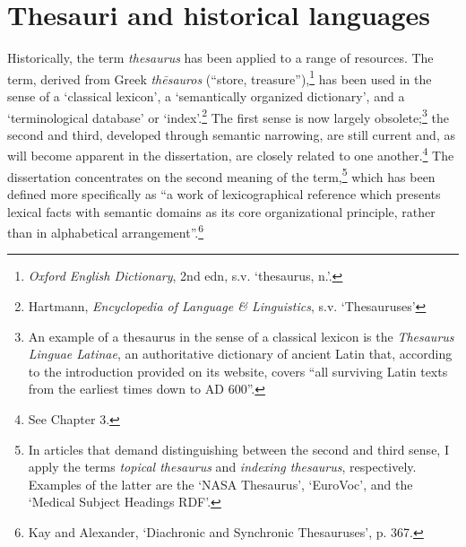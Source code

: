 \section{Thesauri and historical languages}
\label{sect:Introduction:Thesaurus}

Historically, the term \textit{thesaurus} has been applied to a range of resources. The term, derived from Greek \textit{thēsauros} (``store, treasure''),\footnote{\textit{Oxford English Dictionary}, 2nd edn, s.v. `thesaurus, n.'.} has been used in the sense of a `classical lexicon', a `semantically organized dictionary', and a `terminological database' or `index'.\footnote{Hartmann, \textit{Encyclopedia of Language \& Linguistics}, s.v. `Thesauruses'} The first sense is now largely obsolete;\footnote{An example of a thesaurus in the sense of a classical lexicon is the \textit{Thesaurus Linguae Latinae}, an authoritative dictionary of ancient Latin that, according to the introduction provided on its website, covers ``all surviving Latin texts from the earliest times down to AD 600''.} the second and third, developed through semantic narrowing, are still current and, as will become apparent in the dissertation, are closely related to one another.\footnote{See Chapter 3.} The dissertation concentrates on the second meaning of the term,\footnote{In articles that demand distinguishing between the second and third sense, I apply the terms \textit{topical thesaurus} and \textit{indexing thesaurus}, respectively. Examples of the latter are the `NASA Thesaurus', `EuroVoc', and the `Medical Subject Headings RDF'.} which has been defined more specifically as ``a work of lexicographical reference which presents lexical facts with semantic domains as its core organizational principle, rather than in alphabetical arrangement''.\footnote{Kay and Alexander, `Diachronic and Synchronic Thesauruses', p. 367.}

